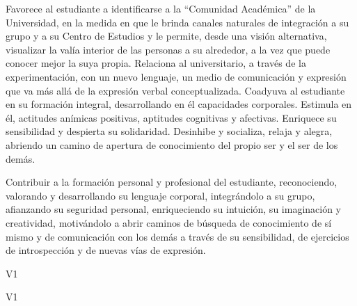 \begin{syllabus}


\begin{justification}
Favorece al estudiante a identificarse a la ``Comunidad Académica'' de la Universidad, en la medida en que le brinda canales naturales de integración a su grupo y  a su Centro de Estudios y le permite,  desde una visión alternativa, visualizar la valía interior de las personas a su alrededor, a la vez que puede conocer mejor la suya propia.
Relaciona al universitario, a través de la experimentación, con un nuevo lenguaje, un medio de comunicación y expresión que va más allá de la expresión verbal conceptualizada.
Coadyuva al estudiante en su formación integral, desarrollando en él  capacidades corporales. Estimula en él, actitudes anímicas positivas,  aptitudes cognitivas y afectivas. Enriquece su sensibilidad y despierta su solidaridad.
Desinhibe y socializa, relaja y alegra,  abriendo un camino de apertura de conocimiento del propio ser y el ser de los demás.

\end{justification}

\begin{goals}
\item Contribuir a la formación personal y profesional del estudiante, reconociendo, valorando y desarrollando su lenguaje corporal, integrándolo a su grupo, afianzando su seguridad personal, enriqueciendo su intuición, su imaginación y creatividad, motivándolo  a abrir caminos de búsqueda  de conocimiento de sí mismo y de comunicación con los demás a través de su sensibilidad, de ejercicios de introspección y de nuevas vías de expresión.
\end{goals}

\begin{outcomes}{V1}
    \item {}
    \item {}
\end{outcomes}

\begin{competences}{V1}
    \item {}
    \item {}
    \item {}
\end{competences}


\end{syllabus}
